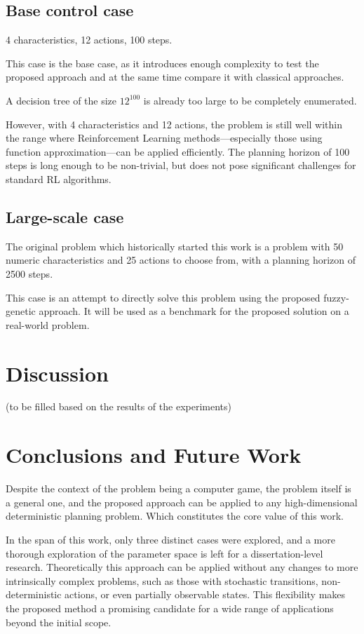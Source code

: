 \documentclass[11pt, a4paper]{article}
\begin{document}
	\subsection{Base control case}
    
	4 characteristics, 12 actions, 100 steps.

	This case is the base case, as it introduces enough complexity to test the proposed approach and at the same time compare it with classical approaches.

	A decision tree of the size $12^{100}$ is already too large to be completely enumerated.

	However, with 4 characteristics and 12 actions, the problem is still well within the range where Reinforcement Learning methods—especially those using function approximation—can be applied efficiently.
	The planning horizon of 100 steps is long enough to be non-trivial, but does not pose significant challenges for standard RL algorithms.

	\subsection{Large-scale case}

	The original problem which historically started this work is a problem with 50 numeric characteristics and 25 actions to choose from, with a planning horizon of 2500 steps.

	This case is an attempt to directly solve this problem using the proposed fuzzy-genetic approach.
	It will be used as a benchmark for the proposed solution on a real-world problem.

	\section{Discussion}

    (to be filled based on the results of the experiments)

	\section{Conclusions and Future Work}

	Despite the context of the problem being a computer game, the problem itself is a general one, and the proposed approach can be applied to any high-dimensional deterministic planning problem.
	Which constitutes the core value of this work.

	In the span of this work, only three distinct cases were explored, and a more thorough exploration of the parameter space is left for a dissertation-level research.
    Theoretically this approach can be applied without any changes to more intrinsically complex problems,
    such as those with stochastic transitions, non-deterministic actions, or even partially observable states.
    This flexibility makes the proposed method a promising candidate for a wide range of applications beyond the initial scope.
\end{document}
